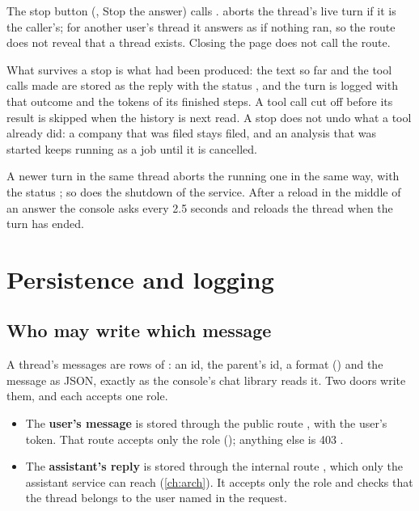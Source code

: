 The stop button (, Stop the answer) calls
.  aborts the thread's live turn
if it is the caller's; for another user's thread it answers as if nothing ran, so the route
does not reveal that a thread exists. Closing the page does not call the route.

What survives a stop is what had been produced: the text so far and the tool calls made are
stored as the reply with the status , and the turn is logged with that outcome
and the tokens of its finished steps. A tool call cut off before its result is skipped when the
history is next read. A stop does not undo what a tool already did: a company that was filed
stays filed, and an analysis that was started keeps running as a job until it is cancelled.

A newer turn in the same thread aborts the running one in the same way, with the status
; so does the shutdown of the service. After a reload in the middle of an
answer the console asks  every 2.5 seconds
and reloads the thread when the turn has ended.


\section{Persistence and logging}\label{sec:chat:persist}

\subsection{Who may write which message}

A thread's messages are rows of : an id, the parent's id, a format
() and the message as JSON, exactly as the console's chat library reads it.
Two doors write them, and each accepts one role.

\begin{itemize}
  \item The \textbf{user's message} is stored through the public route
    , with the user's token. That route accepts
    only the role  (); anything else is 403
    .
  \item The \textbf{assistant's reply} is stored through the internal route
    , which only the assistant service
    can reach (\cref{ch:arch}). It accepts only the role  and checks that the
    thread belongs to the user named in the request.
\end{itemize}

